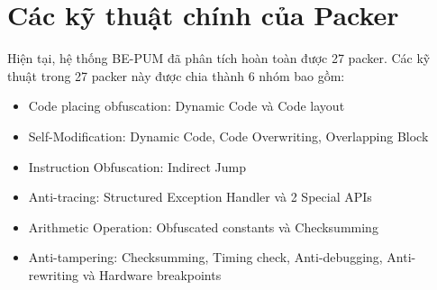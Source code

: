 \section{Các kỹ thuật chính của Packer}

\hspace{0.5cm}Hiện tại, hệ thống BE-PUM đã phân tích hoàn toàn được 27 packer. Các kỹ thuật trong 27 packer này được chia thành 6 nhóm bao gồm:

\begin{itemize}
\item{Code placing obfuscation: Dynamic Code và Code layout}
\item{Self-Modification: Dynamic Code, Code Overwriting, Overlapping Block}
\item{Instruction Obfuscation: Indirect Jump}
\item{Anti-tracing: Structured Exception Handler và 2 Special APIs}
\item{Arithmetic Operation: Obfuscated constants và Checksumming}
\item{Anti-tampering: Checksumming, Timing check, Anti-debugging, Anti-rewriting và Hardware breakpoints}
\end{itemize}

